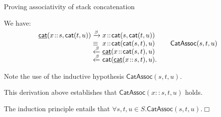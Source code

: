\documentclass[compress,dvipdfmx]{beamer}
\newcommand\fun[1]{\textsf{#1}}
\newcommand\ufun[1]{\underline{\fun{#1}}}
\newcommand\cons[2]{{#1}\!::\!{#2}}
\newcommand\predName[1]{\textsf{#1}}
\newcommand\pred[2]{\predName{#1}({#2})}
\newcommand\IH[1]{#1}
\begin{document}
%
\begin{frame}{Proving associativity of stack concatenation}

  We have:
  \begin{equation*}
    \begin{array}{r@{\;}l@{\;}l@{\qquad}r@{}}
      \ufun{cat}(\cons{x}{s},\fun{cat}(t,u))
      & \xrightarrow{\smash\beta}
      & \cons{x}{\fun{cat}(s,\fun{cat}(t,u))}\\
      & \equiv
      & \cons{x}{\fun{cat}(\fun{cat}(s,t),u)}
      & \IH{\pred{CatAssoc}{s,t,u}}\\
      & \xleftarrow{\smash\beta}
      & \ufun{cat}(\cons{x}{\fun{cat}(s,t)},u)\\
      & \xleftarrow{\smash\beta}
      & \fun{cat}(\ufun{cat}(\cons{x}{s},t),u).
    \end{array}
  \end{equation*}

  Note the use of the inductive hypothesis \(\pred{CatAssoc}{s,t,u}\).

  \bigskip

  This derivation above establishes that
  \(\pred{CatAssoc}{\cons{x}{s},t,u}\) holds.

  \bigskip

  The induction principle entails that \(\forall s,t,u \in
  S.\pred{CatAssoc}{s,t,u}\).\hfill\(\Box\)

\end{frame}
\end{document}
